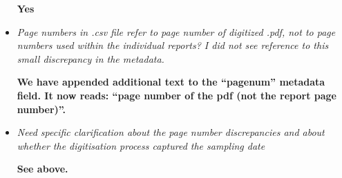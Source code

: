 \documentclass{article}
\begin{document}
\begin{itemize}
\textbf{Yes}

\item \emph{Page numbers in .csv file refer to page number of digitized .pdf, not to page numbers used within the individual reports? I did not see reference to this small discrepancy in the metadata.}

\textbf{We have appended additional text to the “pagenum” metadata field. It now reads: “page number of the pdf (not the report page number)”.}

\item \emph{Need specific clarification about the page number discrepancies and about whether the digitisation process captured the sampling date}

\textbf{See above.}

\end{itemize}
\end{document}

